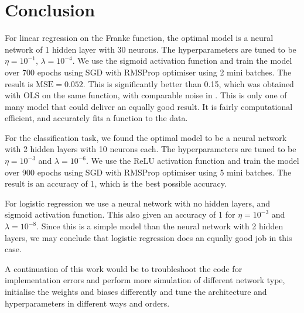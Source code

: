 \section{Conclusion}

For linear regression on the Franke function, the optimal model is a neural network of 1 hidden layer with 30 neurons. The hyperparameters are tuned to be $\eta=10^{-1}$, $\lambda=10^{-4}$. We use the sigmoid activation function and train the model over 700 epochs using SGD with RMSProp optimiser using 2 mini batches. The result is $\mathrm{MSE} = 0.052$. This is significantly better than 0.15, which was obtained with OLS on the same function, with comparable noise in \projectOne. This is only one of many model that could deliver an equally good result. It is fairly computational efficient, and accurately fits a function to the data. 

For the classification task, we found the optimal model to be a neural network with 2 hidden layers with 10 neurons each. The hyperparameters are tuned to be $\eta=10^{-3}$ and $\lambda=10^{-6}$. We use the ReLU activation function and train the model over 900 epochs using SGD with RMSProp optimiser using 5 mini batches. The result is an accuracy of 1, which is the best possible accuracy. 

For logistic regression we use a neural network with no hidden layers, and sigmoid activation function. This also given an accuracy of 1 for $\eta=10^{-3}$ and $\lambda=10^{-8}$. Since this is a simple model than the neural network with 2 hidden layers, we may conclude that logistic regression does an equally good job in this case. 

A continuation of this work would be to troubleshoot the code for implementation errors and perform more simulation of different network type, initialise the weights and biases differently and tune the architecture and hyperparameters in different ways and orders. 